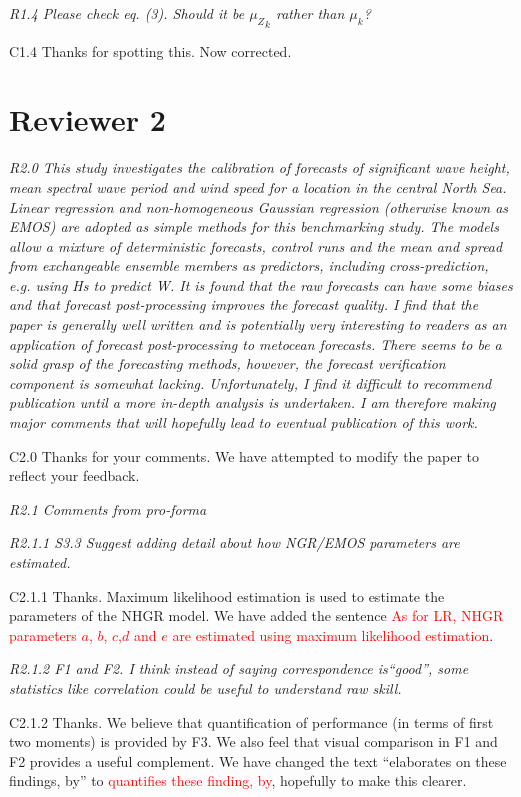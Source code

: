 \documentclass[a4paper,10pt]{article}
\newcommand{\ed}[1]{\textcolor{red}{#1}}
\begin{document}
	\emph{R1.4 Please check eq. (3). Should it be ${\mu_Z}_k$ rather than $\mu_k$?}

	C1.4 Thanks for spotting this. Now corrected.
	
	\section*{Reviewer 2}
	
	\emph{R2.0 This study investigates the calibration of forecasts of significant wave height, mean spectral wave period and wind speed for a location in the central North Sea. Linear regression and non-homogeneous Gaussian regression (otherwise known as EMOS) are adopted as simple methods for this benchmarking study. The models allow a mixture of deterministic forecasts, control runs and the mean and spread from exchangeable ensemble members as predictors, including cross-prediction, e.g. using Hs to predict W. It is found that the raw forecasts can have some biases and that forecast post-processing improves the forecast quality. I find that the paper is generally well written and is potentially very interesting to readers as an application of forecast post-processing to metocean forecasts. There seems to be a solid grasp of the forecasting methods, however, the forecast verification component is somewhat lacking. Unfortunately, I find it difficult to recommend publication until a more in-depth analysis is undertaken. I am therefore making major comments that will hopefully lead to eventual publication of this work.}
	
	C2.0 Thanks for your comments. We have attempted to modify the paper to reflect your feedback.
	
	\emph{R2.1 Comments from pro-forma}
	
	\emph{R2.1.1 S3.3 Suggest adding detail about how NGR/EMOS parameters are estimated.}
	
	C2.1.1 Thanks. Maximum likelihood estimation is used to estimate the parameters of the NHGR model. We have added the sentence \ed{As for LR, NHGR parameters $a$, $b$, $c$,$d$ and $e$ are estimated using maximum likelihood estimation}.
	
	\emph{R2.1.2 F1 and F2. I think instead of saying correspondence is``good'', some statistics like correlation could be useful to understand raw skill.}
	
	C2.1.2 Thanks. We believe that quantification of performance (in terms of first two moments) is provided by F3. We also feel that visual comparison in F1 and F2 provides a useful complement. We have changed the text ``elaborates on these findings, by'' to \ed{quantifies these finding, by}, hopefully to make this clearer.
	
\end{document}
